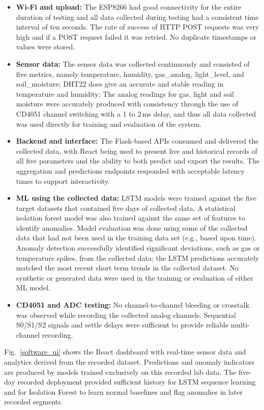 \documentclass[journal,onecolumn]{IEEEtran}
\begin{document}
\begin{itemize}
    \item \textbf{Wi-Fi and upload:} The ESP8266 had good connectivity for the entire duration of testing and all data collected during testing had a consistent time interval of ten seconds. The rate of success of HTTP POST requests was very high and if a POST request failed it was retried. No duplicate timestamps or values were stored.
    \item \textbf{Sensor data:} The sensor data was collected continuously and consisted of five metrics, namely temperature, humidity, gas\_analog, light\_level, and soil\_moisture; DHT22 does give an accurate and stable reading in temperature and humidity; The analog readings for gas, light and soil moisture were accurately produced with consistency through the use of CD4051 channel switching with a 1 to 2\,ms delay, and thus all data collected was used directly for training and evaluation of the system.
    \item \textbf{Backend and interface:} The Flask-based APIs consumed and delivered the collected data, with React being used to present live and historical records of all five parameters and the ability to both predict and export the results. The aggregation and predictions endpoints responded with acceptable latency times to support interactivity.
    \item \textbf{ML using the collected data:} LSTM models were trained against the five target datasets that contained five days of collected data. A statistical isolation forest model was also trained against the same set of features to identify anomalies. Model evaluation was done using some of the collected data that had not been used in the training data set (e.g., based upon time). Anomaly detection successfully identified significant deviations, such as gas or temperature spikes, from the collected data; the LSTM predictions accurately matched the most recent short term trends in the collected dataset. No synthetic or generated data were used in the training or evaluation of either ML model.
    \item \textbf{CD4051 and ADC testing:} No channel-to-channel bleeding or crosstalk was observed while recording the collected analog channels. Sequential S0/S1/S2 signals and settle delays were sufficient to provide reliable multi-channel recording.
\end{itemize}

Fig.~\ref{software_ui} shows the React dashboard with real-time sensor data and analytics derived from the recorded dataset. Predictions and anomaly indicators are produced by models trained exclusively on this recorded lab data. The five-day recorded deployment provided sufficient history for LSTM sequence learning and for Isolation Forest to learn normal baselines and flag anomalies in later recorded segments.
\end{document}
